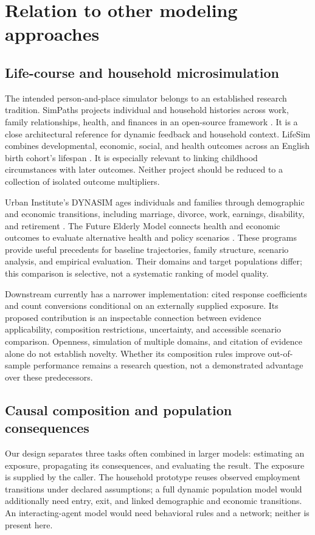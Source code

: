 \documentclass[10pt]{article}
\begin{document}
\section{Relation to other modeling approaches}
\subsection{Life-course and household microsimulation}
The intended person-and-place simulator belongs to an established research
tradition. SimPaths projects individual and household histories across
work, family relationships, health, and finances in an open-source
framework \cite{bronka2025simpaths}. It is a close architectural
reference for dynamic feedback and household context. LifeSim combines
developmental, economic, social, and health outcomes across an English
birth cohort's lifespan \cite{skarda2021lifesim}. It is especially relevant
to linking childhood circumstances with later outcomes. Neither project
should be reduced to a collection of isolated outcome multipliers.

Urban Institute's DYNASIM ages individuals and families through demographic
and economic transitions, including marriage, divorce, work, earnings,
disability, and retirement \cite{urban2015dynasim}. The Future Elderly
Model connects health and economic outcomes to evaluate alternative
health and policy scenarios \cite{uscFEM}. These programs provide useful
precedents for baseline trajectories, family structure, scenario analysis,
and empirical evaluation. Their domains and target populations differ;
this comparison is selective, not a systematic ranking of model quality.

Downstream currently has a narrower implementation: cited response
coefficients and count conversions conditional on an externally supplied
exposure. Its proposed contribution is an inspectable connection between
evidence applicability, composition restrictions, uncertainty, and
accessible scenario comparison. Openness, simulation of multiple domains,
and citation of evidence alone do not establish novelty. Whether its
composition rules improve out-of-sample performance remains a research
question, not a demonstrated advantage over these predecessors.

\subsection{Causal composition and population consequences}
Our design separates three tasks often combined in larger models:
estimating an exposure, propagating its consequences, and evaluating the
result. The exposure is supplied by the caller. The household prototype
reuses observed employment transitions under declared assumptions; a full
dynamic population model would additionally need entry, exit, and linked
demographic and economic transitions. An interacting-agent model would need
behavioral rules and a network; neither is present here.
\end{document}
